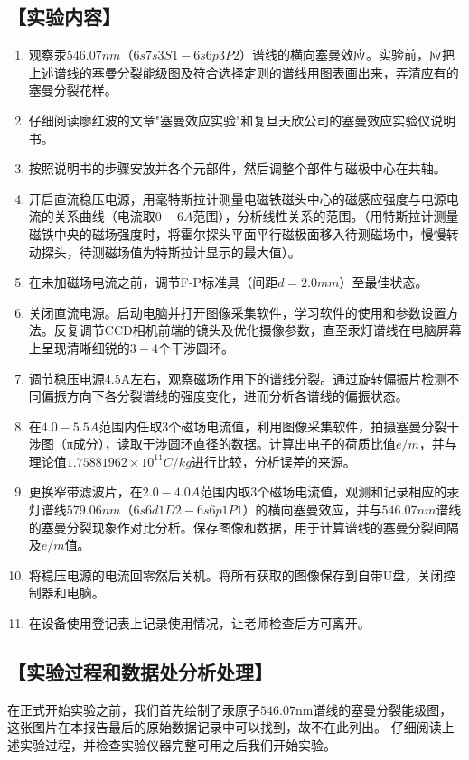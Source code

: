 \documentclass[12pt,a4paper,UTF8]{ctexart}
\begin{document}
\subsection*{【实验内容】}
\begin{enumerate}[(1)]
\item 观察汞$546.07nm（6s7s 3S1-6s6p 3P2）$谱线的横向塞曼效应。实验前，应把上述谱线的塞曼分裂能级图及符合选择定则的谱线用图表画出来，弄清应有的塞曼分裂花样。
\item 仔细阅读廖红波的文章"塞曼效应实验"和复旦天欣公司的塞曼效应实验仪说明书。
\item 按照说明书的步骤安放并各个元部件，然后调整个部件与磁极中心在共轴。
\item 开启直流稳压电源，用毫特斯拉计测量电磁铁磁头中心的磁感应强度与电源电流的关系曲线（电流取$0-6 A$范围），分析线性关系的范围。（用特斯拉计测量磁铁中央的磁场强度时，将霍尔探头平面平行磁极面移入待测磁场中，慢慢转动探头，待测磁场值为特斯拉计显示的最大值）。
\item 在未加磁场电流之前，调节F-P标准具（间距$d =2.0mm$）至最佳状态。
\item 关闭直流电源。启动电脑并打开图像采集软件，学习软件的使用和参数设置方法。反复调节CCD相机前端的镜头及优化摄像参数，直至汞灯谱线在电脑屏幕上呈现清晰细锐的$3-4$个干涉圆环。
\item 调节稳压电源4.5A左右，观察磁场作用下的谱线分裂。通过旋转偏振片检测不同偏振方向下各分裂谱线的强度变化，进而分析各谱线的偏振状态。
\item 在$4.0-5.5 A$范围内任取3个磁场电流值，利用图像采集软件，拍摄塞曼分裂干涉图（π成分），读取干涉圆环直径的数据。计算出电子的荷质比值$e/m$，并与理论值$1.75881962×10^{11} C/kg$进行比较，分析误差的来源。
\item 更换窄带滤波片，在$2.0-4.0A$范围内取3个磁场电流值，观测和记录相应的汞灯谱线$579.06nm（6s6d1D2-6s6p1P1）$的横向塞曼效应，并与$546.07nm$谱线的塞曼分裂现象作对比分析。保存图像和数据，用于计算谱线的塞曼分裂间隔及$e/m$值。
\item 将稳压电源的电流回零然后关机。将所有获取的图像保存到自带U盘，关闭控制器和电脑。
\item 在设备使用登记表上记录使用情况，让老师检查后方可离开。
\end{enumerate}

\subsection*{【实验过程和数据处分析处理】}
在正式开始实验之前，我们首先绘制了汞原子$546.07\mathrm{nm}$谱线的塞曼分裂能级图，这张图片在本报告最后的原始数据记录中可以找到，故不在此列出。
仔细阅读上述实验过程，并检查实验仪器完整可用之后我们开始实验。
\end{document}
